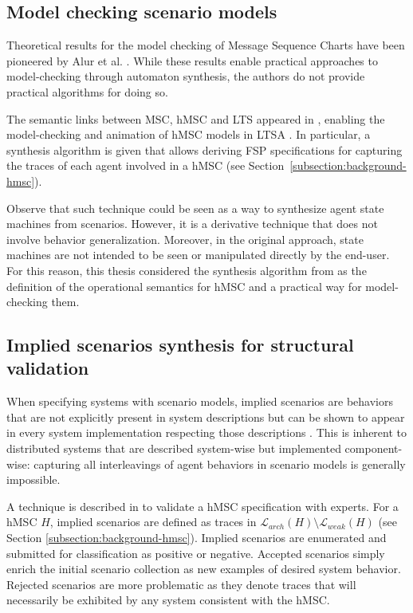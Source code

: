 
\subsection{Model checking scenario models\label{section:related-for-analysis-2}}

Theoretical results for the model checking of Message Sequence Charts have been pioneered by Alur et al. \cite{Alur:1999, Alur:2000}. While these results enable practical approaches to model-checking through automaton synthesis, the authors do not provide practical algorithms for doing so.

The semantic links between MSC, hMSC and LTS appeared in \cite{Uchitel:2001, Uchitel:2001b}, enabling the model-checking and animation of hMSC models in LTSA \cite{Uchitel:2003}. In particular, a synthesis algorithm is given that allows deriving FSP specifications for capturing the traces of each agent involved in a hMSC (see Section~\ref{subsection:background-hmsc}). 

Observe that such technique could be seen as a way to synthesize agent state machines from scenarios. However, it is a derivative technique that does not involve behavior generalization. Moreover, in the original approach, state machines are not intended to be seen or manipulated directly by the end-user. For this reason, this thesis considered the synthesis algorithm from \cite{Uchitel:2003} as the definition of the operational semantics for hMSC and a practical way for model-checking them.


\subsection{Implied scenarios synthesis for structural validation\label{section:related-for-analysis-3}}

When specifying systems with scenario models, implied scenarios are behaviors that are not explicitly present in system descriptions but can be shown to appear in every system implementation respecting those descriptions \cite{Alur:2000, Uchitel:2004}. This is inherent to distributed systems that are described system-wise but implemented component-wise: capturing all interleavings of agent behaviors in scenario models is generally impossible.

A technique is described in \cite{Uchitel:2004} to validate a hMSC specification with experts. For a hMSC $H$, implied scenarios are defined as traces in $\mathcal{L}_{arch}(H) \setminus \mathcal{L}_{weak}(H)$ (see Section \ref{subsection:background-hmsc}). Implied scenarios are enumerated and submitted for classification as positive or negative. Accepted scenarios simply enrich the initial scenario collection as new examples of desired system behavior. Rejected scenarios are more problematic as they denote traces that will necessarily be exhibited by any system consistent with the hMSC.


